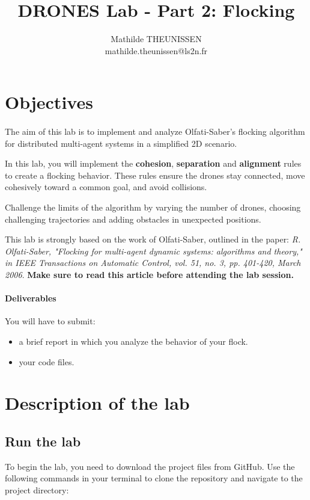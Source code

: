 \documentclass{article}
\title{DRONES Lab - Part 2: Flocking}
\author{Mathilde THEUNISSEN \\ mathilde.theunissen@ls2n.fr}
\begin{document}
\maketitle

\section{Objectives}

\paragraph{}
The aim of this lab is to implement and analyze Olfati-Saber's flocking algorithm for distributed multi-agent systems in a simplified 2D scenario.

In this lab, you will implement the \textbf{cohesion}, \textbf{separation} and \textbf{alignment} rules to create a flocking behavior. These rules ensure the drones stay connected, move cohesively toward a common goal, and avoid collisions.

Challenge the limits of the algorithm by varying the number of drones, choosing challenging trajectories and adding obstacles in unexpected positions.

This lab is strongly based on the work of Olfati-Saber, outlined in the paper:
 \textit{R. Olfati-Saber, "Flocking for multi-agent dynamic systems: algorithms and theory," in IEEE Transactions on Automatic Control, vol. 51, no. 3, pp. 401-420, March 2006}. \textbf{Make sure to read this article before attending the lab session.}
 
\paragraph{Deliverables} You will have to submit:
\begin{itemize}
 \item a brief report in which you analyze the behavior of your flock.
 \item your code files.
\end{itemize}
 
\section{Description of the lab}

\subsection{Run the lab}
To begin the lab, you need to download the project files from GitHub. Use the following commands in your terminal to clone the repository and navigate to the project directory:
\end{document}
